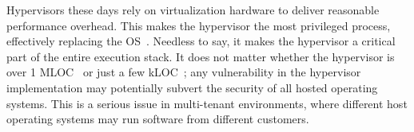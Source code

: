







Hypervisors these days rely on virtualization hardware to deliver
reasonable performance overhead. This makes the hypervisor the most
privileged process, effectively replacing the OS~\cite{heiser:hotos11}.
Needless to say, it makes the hypervisor a critical part of the entire
execution stack.  It does not matter whether the hypervisor is over 1
MLOC~\cite{barham:sosp03} or just a few kLOC~\cite{steinberg:eurosys10};
any vulnerability in the hypervisor implementation may potentially
subvert the security of all hosted operating systems. This is a serious
issue in multi-tenant environments, where different host operating systems
may run software from different customers.

